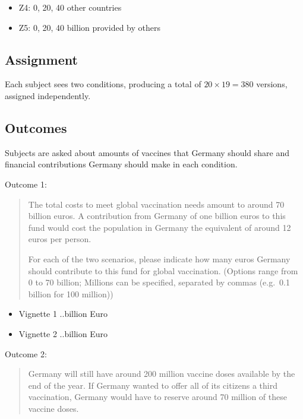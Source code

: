 \documentclass[]{article}
\begin{document}
\begin{itemize}
	\item
	Z4: 0, 20, 40 other countries
	\item
	Z5: 0, 20, 40 billion provided by others
\end{itemize}

\hypertarget{assignment-1}{%
	\subsection{Assignment}\label{assignment-1}}

Each subject sees two conditions, producing a total of
\(20 \times 19 = 380\) versions, assigned independently.

\hypertarget{outcomes-1}{%
	\subsection{Outcomes}\label{outcomes-1}}

Subjects are asked about amounts of vaccines that Germany should share
and financial contributions Germany should make in each condition.

Outcome 1:

\begin{quote}
	The total costs to meet global vaccination needs amount to around 70
	billion euros. A contribution from Germany of one billion euros to this
	fund would cost the population in Germany the equivalent of around 12
	euros per person.
	
	For each of the two scenarios, please indicate how many euros Germany
	should contribute to this fund for global vaccination. (Options range
	from 0 to 70 billion; Millions can be specified, separated by commas
	(e.g.~0.1 billion for 100 million))
\end{quote}

\begin{itemize}
	\item
	Vignette 1 ..billion Euro
	\item
	Vignette 2 ..billion Euro
\end{itemize}

Outcome 2:

\begin{quote}
	Germany will still have around 200 million vaccine doses available by
	the end of the year. If Germany wanted to offer all of its citizens a
	third vaccination, Germany would have to reserve around 70 million of
	these vaccine doses.
\end{quote}
\end{document}
